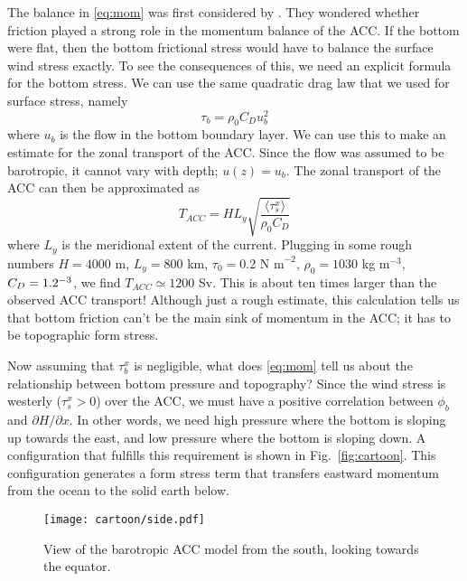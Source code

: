 \documentclass[12pt]{article}
\newcommand{\ab}[1]{\ensuremath{\langle #1 \rangle}}
\newcommand{\nms}{\ensuremath{\mbox{ N m}^{-2}}}
\begin{document}
The balance in \eqref{eq:mom} was first considered by \citet{MunkPalmen1951}. They wondered whether friction played a strong role in the momentum balance of the ACC. If the bottom were flat, then the bottom frictional stress would have to balance the surface wind stress exactly. To see the consequences of this, we need an explicit formula for the bottom stress. We can use the same quadratic drag law that we used for surface stress, namely
\begin{equation}
\tau_b = \rho_0 C_D u_b^2
\end{equation}
where $u_b$ is the flow in the bottom boundary layer. We can use this to make an estimate for the zonal transport of the ACC. Since the flow was assumed to be barotropic, it cannot vary with depth; $u(z) = u_b$. The zonal transport of the ACC can then be approximated as
\begin{equation}
T_{ACC} = H L_y \sqrt{ \frac{ \ab{\tau^x_s} }{ \rho_0 C_D } }
\end{equation}
where $L_y$ is the meridional extent of the current. Plugging in some rough numbers $H = 4000$ m, $L_y = 800$ km, $\tau_0 = 0.2 \nms$, $\rho_0 = 1030$ kg m$^{-3}$, $C_D = 1.2 \time 10^{-3}$, we find $T_{ACC} \simeq 1200 $ Sv. This is about ten times larger than the observed ACC transport! Although just a rough estimate, this calculation tells us that bottom friction can't be the main sink of momentum in the ACC; it has to be topographic form stress. 

Now assuming that $\tau^x_b$ is negligible, what does \eqref{eq:mom} tell us about the relationship between bottom pressure and topography? Since the wind stress is westerly ($\tau^x_s > 0$) over the ACC, we must have a positive correlation between $\phi_b$ and $\partial H / \partial x$. In other words, we need high pressure where the bottom is sloping up towards the east, and low pressure where the bottom is sloping down. A configuration that fulfills this requirement is shown in Fig.~\ref{fig:cartoon}. This configuration generates a form stress term that transfers eastward momentum from the ocean to the solid earth below.

\begin{figure}[htbp]
\begin{center}
\texttt{[image: cartoon/side.pdf]}
\caption{View of the barotropic ACC model from the south, looking towards the equator.}
\label{fig:cartoon_side}
\end{center}
\end{figure}
\end{document}

